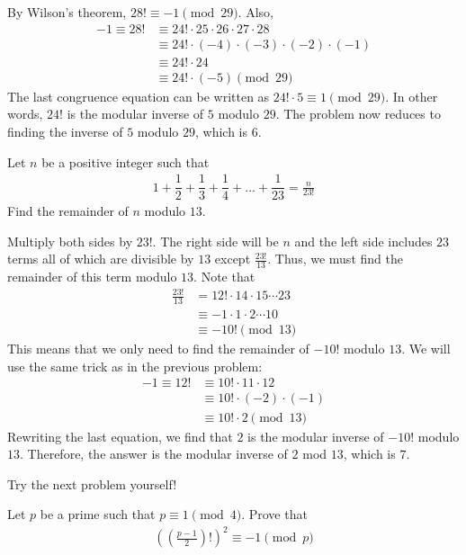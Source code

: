 	\begin{solution}
		By Wilson's theorem, $28! \equiv -1 \pmod{29}$. Also,
			\begin{align*}
				-1 \equiv 28! &\equiv 24! \cdot 25 \cdot 26 \cdot 27 \cdot 28\\
	    &\equiv 24! \cdot (-4) \cdot (-3) \cdot (-2) \cdot (-1)\\
	    &\equiv 24! \cdot 24\\
	    &\equiv 24! \cdot (-5)\pmod{29}
			\end{align*}
		The last congruence equation can be written as $24! \cdot 5 \equiv 1 \pmod{29}$. In other words, $24!$ is the modular inverse of $5$ modulo $29$. The problem now reduces to finding the inverse of $5$ modulo $29$, which is $6$.

	\end{solution}

	\begin{problem}
		Let $n$ be a positive integer such that
			\begin{align*}
				1 + \dfrac{1}{2} + \dfrac{1}{3} + \dfrac{1}{4} +\ldots + \dfrac{1}{23} = \frac{n}{23!}
			\end{align*}
		Find the remainder of $n$ modulo $13$.
	\end{problem}

	\begin{solution}
		Multiply both sides by $23!$. The right side will be $n$ and the left side includes $23$ terms all of which are divisible by $13$ except $\frac{23!}{13}$. Thus, we must find the remainder of this term modulo $13$. Note that
			\begin{align*}
				\frac{23!}{13} &= 12! \cdot 14 \cdot 15 \cdots 23\\
				   &\equiv -1 \cdot 1 \cdot 2 \cdots 10\\
				   &\equiv -10! \pmod{13}
			\end{align*}
		This means that we only need to find the remainder of $-10!$ modulo $13$. We will use the same trick as in the previous problem:
			\begin{align*}
				-1 \equiv 12! &\equiv 10! \cdot 11 \cdot 12\\
					&\equiv 10! \cdot (-2) \cdot (-1)\\
					&\equiv 10! \cdot 2\pmod{13}
			\end{align*}
		Rewriting the last equation, we find that $2$ is the modular inverse of $-10!$ modulo $13$. Therefore, the answer is the modular inverse of $2$ mod $13$, which is $7$.
	\end{solution}
Try the next problem yourself!
	\begin{problem}
		Let $p$ be a prime such that $p \equiv 1 \pmod 4$. Prove that
			\begin{align*}
				\left(\left(\frac{p-1}{2}\right)!\right)^2 \equiv -1 \pmod p
			\end{align*}
	\end{problem}

